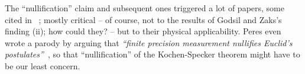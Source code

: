 \documentclass[%
  twocolumn,
 showpacs,
 showkeys,
 preprintnumbers,
 amsmath,amssymb,
 aps,
  pra,
  longbibliography,
 floatfix,
 ]{revtex4-1}
\begin{document}
The ``nullification'' claim and subsequent ones triggered a lot of papers, some cited in ~\cite{Barrett-2004};
mostly critical -- of course, not to the results of Godsil and Zaks's finding (ii); how could they? -- but to their physical applicability.
Peres even wrote a parody by arguing that  {\em ``finite precision measurement nullifies Euclid's postulates''}~\cite{peres-2003-fpnep},
so that ``nullification'' of the Kochen-Specker theorem might have to be our least concern.
%
%
\end{document}
